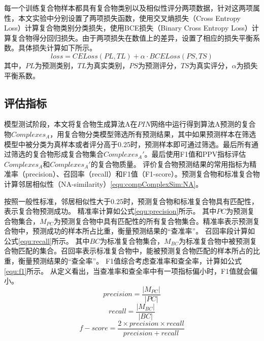 {每一个训练复合物样本都具有复合物类别以及相似性评分两项数据，针对这两项属性，本文实验中分别设置了两项损失函数，使用交叉熵损失（Cross Entropy Loss）计算复合物类别分类损失，使用BCE损失（Binary Cross Entropy Loss）计算复合物得分回归损失。由于两项损失在数值上的差异，设置了相应的损失平衡系数。具体损失计算如下所示。
\begin{equation}
    \label{equ:loss}
    loss=CELoss(PL,TL)+\alpha \cdot BCELoss(PS,TS)
\end{equation}
其中，$PL$为预测类别，$TL$为真实类别，$PS$为预测评分，$TS$为真实评分，$\alpha$为损失平衡系数。

\subsection{评估指标}
\label{subsection:allExperienceDesign:metrix}

模型测试阶段，本文将复合物生成算法A在$PIN$网络中运行得到算法A预测的复合物$Complexes_A$，用复合物分类模型筛选所有预测结果，其中如果预测样本在筛选模型中被分类为真样本或者评分高于0.25时，预测样本即可通过筛选。最后所有通过筛选的复合物形成复合物集合$Complexes_A'$。最后使用F1值和PPV指标评估$Complexes_A$和$Complexes_A'$的复合物质量。
评价复合物预测结果的常用指标为精准率（precision）、召回率（recall）和F1值（F1-score）。预测复合物和标准复合物计算邻居相似性（NA-similarity）\ref{equ:compComplexSim:NA}。

按照一般性标准，邻居相似性大于0.25时，预测复合物和标准复合物具有匹配性，表示复合物预测成功。
精准率计算如公式\ref{equ:precision}所示。
其中$PC$为预测复合物集合，$M_{PC}$为预测复合物中具有匹配性的所有复合物集合。精准率表示预测复合物中，预测成功的样本所占比重，衡量预测结果的“查准率”。
召回率段计算如公式\ref{equ:recall}所示。
其中$BC$为标准复合物集合，$M_{BC}$为标准复合物中被预测复合物匹配的集合。召回率表示标准复合物中，能被预测复合物匹配的样本所占的比重，衡量预测结果的“查全率”。
F1值综合考虑查准率和查全率，计算如公式\ref{equ:f1}所示。
从定义看出，当查准率和查全率中有一项指标偏小时，F1值就会偏小。
\begin{equation}
    \label{equ:precision}
    precision=\frac{\left\lvert M_{PC}\right\rvert }{\left\lvert PC\right\rvert }
\end{equation}
\begin{equation}
    \label{equ:recall}
    recall=\frac{\left\lvert M_{BC}\right\rvert }{\left\lvert BC\right\rvert }
\end{equation}
\begin{equation}
    \label{equ:f1}
    f-score=\frac{2\times precision\times recall}{precision + recall }
\end{equation}

}
